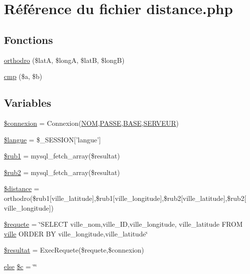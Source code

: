 \hypertarget{distance_8php}{
\section{R\'{e}f\'{e}rence du fichier distance.php}
\label{distance_8php}
}
\subsection*{Fonctions}
\begin{CompactItemize}
\item 
\hyperlink{distance_8php_a8}{orthodro} (\$lat\-A, \$long\-A, \$lat\-B, \$long\-B)
\item 
\hyperlink{distance_8php_a9}{cmp} (\$a, \$b)
\end{CompactItemize}
\subsection*{Variables}
\begin{CompactItemize}
\item 
\hyperlink{distance_8php_a0}{\$connexion} = Connexion(\hyperlink{pma__connect_8php_a0}{NOM},\hyperlink{pma__connect_8php_a1}{PASSE},\hyperlink{pma__connect_8php_a3}{BASE},\hyperlink{pma__connect_8php_a2}{SERVEUR})
\item 
\hyperlink{distance_8php_a1}{\$langue} = \$\_\-SESSION\mbox{[}'langue'\mbox{]}
\item 
\hyperlink{distance_8php_a2}{\$rub1} = mysql\_\-fetch\_\-array(\$resultat)
\item 
\hyperlink{distance_8php_a3}{\$rub2} = mysql\_\-fetch\_\-array(\$resultat)
\item 
\hyperlink{distance_8php_a4}{\$distance} = orthodro(\$rub1\mbox{[}ville\_\-latitude\mbox{]},\$rub1\mbox{[}ville\_\-longitude\mbox{]},\$rub2\mbox{[}ville\_\-latitude\mbox{]},\$rub2\mbox{[}ville\_\-longitude\mbox{]})
\item 
\hyperlink{distance_8php_a5}{\$requete} = \char`\"{}SELECT ville\_\-nom,ville\_\-ID,ville\_\-longitude, ville\_\-latitude FROM \hyperlink{apa__zone_8php_a33}{ville} ORDER BY ville\_\-longitude,ville\_\-latitude\char`\"{}
\item 
\hyperlink{distance_8php_a6}{\$resultat} = Exec\-Requete(\$requete,\$connexion)
\item 
\hyperlink{cron_8php_a9}{else} \hyperlink{distance_8php_a7}{\$c} = \char`\"{}\char`\"{}
\end{CompactItemize}


